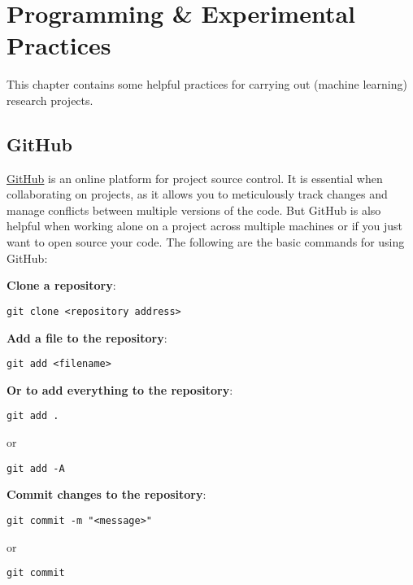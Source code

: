 \chapter{Programming \& Experimental Practices}

This chapter contains some helpful practices for carrying out (machine learning) research projects.

\section{GitHub}

\href{https://github.com/}{GitHub} is an online platform for project source control. It is essential when collaborating on projects, as it allows you to meticulously track changes and manage conflicts between multiple versions of the code. But GitHub is also helpful when working alone on a project across multiple machines or if you just want to open source your code. The following are the basic commands for using GitHub:
\newline

\noindent \textbf{Clone a repository}:

\begin{lstlisting}[style=python]
git clone <repository address>
\end{lstlisting}

\noindent \textbf{Add a file to the repository}:

\begin{lstlisting}[style=python]
git add <filename>
\end{lstlisting}

\noindent \textbf{Or to add everything to the repository}:

\begin{lstlisting}[style=python]
git add .
\end{lstlisting}

or

\begin{lstlisting}[style=python]
git add -A
\end{lstlisting}

\noindent \textbf{Commit changes to the repository}:

\begin{lstlisting}[style=python]
git commit -m "<message>"
\end{lstlisting}

or

\begin{lstlisting}[style=python]
git commit
\end{lstlisting}

